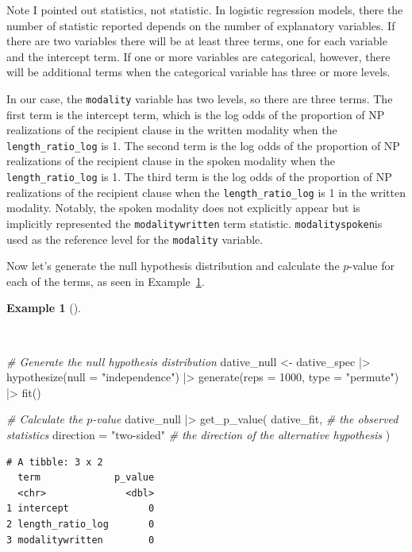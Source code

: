 \documentclass[
  letterpaper,
]{book}
\newenvironment{Shaded}{\begin{snugshade}}{\end{snugshade}}
\newcommand{\AttributeTok}[1]{\textcolor[rgb]{0.00,0.00,0.00}{#1}}
\newcommand{\CommentTok}[1]{\textcolor[rgb]{0.00,0.00,0.00}{\textit{#1}}}
\newcommand{\DecValTok}[1]{\textcolor[rgb]{0.00,0.00,0.00}{#1}}
\newcommand{\FunctionTok}[1]{\textcolor[rgb]{0.00,0.00,0.00}{#1}}
\newcommand{\NormalTok}[1]{\textcolor[rgb]{0.00,0.00,0.00}{#1}}
\newcommand{\OtherTok}[1]{\textcolor[rgb]{0.00,0.00,0.00}{#1}}
\newcommand{\SpecialCharTok}[1]{\textcolor[rgb]{0.00,0.00,0.00}{#1}}
\newcommand{\StringTok}[1]{\textcolor[rgb]{0.00,0.00,0.00}{#1}}
\theoremstyle{definition}
\newtheorem{example}{Example}[chapter]
\theoremstyle{remark}
\begin{document}
Note I pointed out statistics, not statistic. In logistic regression
models, there the number of statistic reported depends on the number of
explanatory variables. If there are two variables there will be at least
three terms, one for each variable and the intercept term. If one or
more variables are categorical, however, there will be additional terms
when the categorical variable has three or more levels.

In our case, the \texttt{modality} variable has two levels, so there are
three terms. The first term is the intercept term, which is the log odds
of the proportion of NP realizations of the recipient clause in the
written modality when the \texttt{length\_ratio\_log} is 1. The second
term is the log odds of the proportion of NP realizations of the
recipient clause in the spoken modality when the
\texttt{length\_ratio\_log} is 1. The third term is the log odds of the
proportion of NP realizations of the recipient clause when the
\texttt{length\_ratio\_log} is 1 in the written modality. Notably, the
spoken modality does not explicitly appear but is implicitly represented
the \texttt{modalitywritten} term statistic. \texttt{modalityspoken}is
used as the reference level for the \texttt{modality} variable.

Now let's generate the null hypothesis distribution and calculate the
\(p\)-value for each of the terms, as seen in
Example~\ref{exm-infer-cat-null-hypothesis-logistic-regression}.

\begin{example}[]\protect\hypertarget{exm-infer-cat-null-hypothesis-logistic-regression}{}\label{exm-infer-cat-null-hypothesis-logistic-regression}

~

\begin{Shaded}
\begin{Highlighting}[]
\CommentTok{\# Generate the null hypothesis distribution}
\NormalTok{dative\_null }\OtherTok{\textless{}{-}}
\NormalTok{  dative\_spec }\SpecialCharTok{|\textgreater{}}
  \FunctionTok{hypothesize}\NormalTok{(}\AttributeTok{null =} \StringTok{"independence"}\NormalTok{) }\SpecialCharTok{|\textgreater{}}
  \FunctionTok{generate}\NormalTok{(}\AttributeTok{reps =} \DecValTok{1000}\NormalTok{, }\AttributeTok{type =} \StringTok{"permute"}\NormalTok{) }\SpecialCharTok{|\textgreater{}}
  \FunctionTok{fit}\NormalTok{()}

\CommentTok{\# Calculate the $p${-}value}
\NormalTok{dative\_null }\SpecialCharTok{|\textgreater{}}
  \FunctionTok{get\_p\_value}\NormalTok{(}
\NormalTok{    dative\_fit, }\CommentTok{\# the observed statistics}
    \AttributeTok{direction =} \StringTok{"two{-}sided"} \CommentTok{\# the direction of the alternative hypothesis}
\NormalTok{  )}
\end{Highlighting}
\end{Shaded}

\begin{verbatim}
# A tibble: 3 x 2
  term             p_value
  <chr>              <dbl>
1 intercept              0
2 length_ratio_log       0
3 modalitywritten        0
\end{verbatim}

\end{example}
\end{document}
